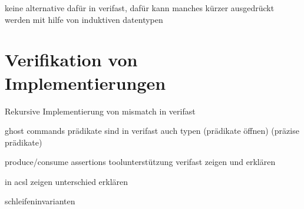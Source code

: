 keine alternative dafür in verifast, dafür kann manches kürzer ausgedrückt werden mit hilfe von induktiven datentypen


\section{Verifikation von Implementierungen}

Rekursive Implementierung von mismatch
in verifast

ghost commands
prädikate sind in verifast auch typen
(prädikate öffnen)
(präzise prädikate)


produce/consume assertions
toolunterstützung verifast zeigen und erklären


in acsl zeigen
unterschied erklären


schleifeninvarianten


